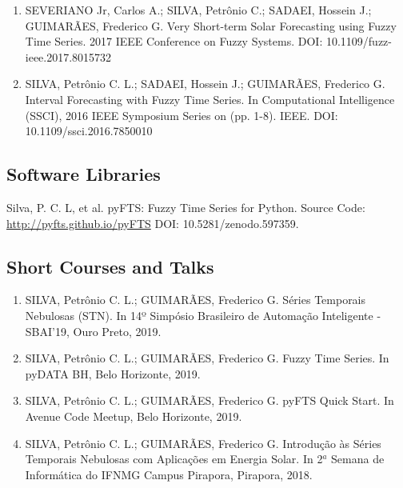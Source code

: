 \begin{enumerate}
\item SEVERIANO Jr, Carlos A.; SILVA, Petrônio C.; SADAEI, Hossein J.; GUIMARÃES, Frederico G. Very Short-term Solar Forecasting using Fuzzy Time Series. 2017 IEEE Conference on Fuzzy Systems. DOI: 10.1109/fuzz-ieee.2017.8015732 \nocite{Severiano2017a}
\item SILVA, Petrônio C. L.; SADAEI, Hossein J.;  GUIMARÃES, Frederico G. Interval Forecasting with Fuzzy Time Series. In Computational Intelligence (SSCI), 2016 IEEE Symposium Series on (pp. 1-8). IEEE. DOI: 10.1109/ssci.2016.7850010 \nocite{Silva2016ifts}
\end{enumerate}

\subsection{Software Libraries}

Silva, P. C. L, et al. pyFTS: Fuzzy Time Series for Python. Source Code: \url{http://pyfts.github.io/pyFTS} DOI: 10.5281/zenodo.597359. \nocite{pyFTS}

\subsection{Short Courses and Talks}

\begin{enumerate}
    \item SILVA, Petrônio C. L.; GUIMARÃES, Frederico G. Séries Temporais Nebulosas (STN). In 14º Simpósio Brasileiro de Automação Inteligente - SBAI'19, Ouro Preto, 2019.
    \item SILVA, Petrônio C. L.; GUIMARÃES, Frederico G. Fuzzy Time Series. In pyDATA BH, Belo Horizonte, 2019.
    \item SILVA, Petrônio C. L.; GUIMARÃES, Frederico G. pyFTS Quick Start. In Avenue Code Meetup, Belo Horizonte, 2019.
    \item SILVA, Petrônio C. L.; GUIMARÃES, Frederico G. Introdução às Séries Temporais Nebulosas com Aplicações em Energia Solar. In 2$^a$ Semana de Informática do IFNMG Campus Pirapora, Pirapora, 2018.
\end{enumerate}


